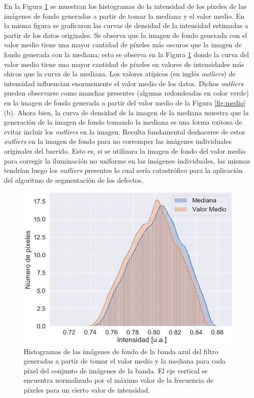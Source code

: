 En la Figura \ref{fig:comparhists} se muestran los histogramas de la intensidad de los píxeles de las imágenes de fondo generadas a partir de tomar la mediana y el valor medio. En la misma figura se graficaron las curvas de densidad de la intensidad estimadas a partir de los datos originales. Se observa que la imagen de fondo generada con el valor medio tiene una mayor cantidad de píxeles más oscuros que la imagen de fondo generada con la mediana; esto se observa en la Figura \ref{fig:comparhists} donde la curva del valor medio tiene una mayor cantidad de píxeles en valores de intensidades más chicos que la curva de la mediana. Los valores atípicos (en inglés \textit{outliers}) de intensidad influencian enormemente el valor medio de los datos. Dichos \textit{outliers} pueden observarse como manchas presentes (algunas redondeadas en color verde) en la imagen de fondo generada a partir del valor medio de la Figura \ref{fig:medio} (b). Ahora bien, la curva de densidad de la imagen de la mediana muestra que la generación de la imagen de fondo tomando la mediana es una forma exitosa de evitar incluir los \textit{outliers} en la imagen. Resulta fundamental deshacerse de estos \textit{outliers} en la imagen de fondo para no corromper las imágenes individuales originales del barrido. Esto es, si se utilizara la imagen de fondo del valor medio para corregir la iluminación no uniforme en las imágenes individuales, las mismas tendrían luego los \textit{outliers} presentes lo cual sería catastrófico para la aplicación del algoritmo de segmentación de los defectos.
\begin{figure}[H]
	\centering
\includegraphics[width=1.0\textwidth]{Figs/defectosZEISS/comparhistsmedi.png}
\caption{Histogramas de las imágenes de fondo de la banda azul del filtro generadas a partir de tomar el valor medio y la mediana para cada píxel del conjunto de imágenes de la banda. El eje vertical se encuentra normalizado por el máximo valor de la frecuencia de píxeles para un cierto valor de intensidad.}
\label{fig:comparhists}
\end{figure}	
	

